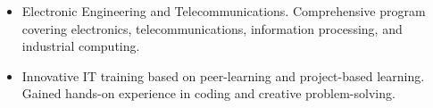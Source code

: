 \documentclass[10pt,a4paper,ragged2e,withhyper]{altacv}
\begin{document}

\begin{itemize}
\item Electronic Engineering and Telecommunications. Comprehensive program covering electronics, telecommunications, information processing, and industrial computing.
\end{itemize}

\divider

\begin{itemize}
\item Innovative IT training based on peer-learning and project-based learning. Gained hands-on experience in coding and creative problem-solving.
\end{itemize}

\medskip
\end{document}
